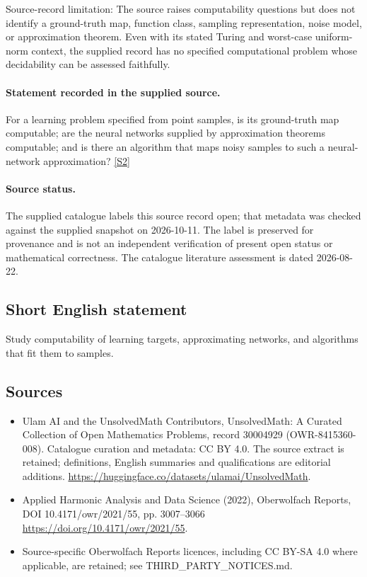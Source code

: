 \documentclass[11pt]{article}
\begin{document}
Source-record limitation: The source raises computability questions but does not identify a ground-truth map, function class, sampling representation, noise model, or approximation theorem. Even with its stated Turing and worst-case uniform-norm context, the supplied record has no specified computational problem whose decidability can be assessed faithfully.
\paragraph{Statement recorded in the supplied source.}
For a learning problem specified from point samples, is its ground-truth map computable; are the neural networks supplied by approximation theorems computable; and is there an algorithm that maps noisy samples to such a neural-network approximation? \href{https://doi.org/10.4171/owr/2021/55}{[S2]}
\paragraph{Source status.}
The supplied catalogue labels this source record open; that metadata was checked against the supplied snapshot on 2026-10-11. The label is preserved for provenance and is not an independent verification of present open status or mathematical correctness. The catalogue literature assessment is dated 2026-08-22.
\subsection{Short English statement}
Study computability of learning targets, approximating networks, and algorithms that fit them to samples.
\subsection{Sources}
\begin{itemize}
\item[S1] Ulam AI and the UnsolvedMath Contributors, UnsolvedMath: A Curated Collection of Open Mathematics Problems, record 30004929 (OWR-8415360-008). Catalogue curation and metadata: CC BY 4.0. The source extract is retained; definitions, English summaries and qualifications are editorial additions.
\url{https://huggingface.co/datasets/ulamai/UnsolvedMath}.
\item[S2] Applied Harmonic Analysis and Data Science (2022), Oberwolfach Reports, DOI 10.4171/owr/2021/55, pp. 3007--3066
\url{https://doi.org/10.4171/owr/2021/55}.
\item Source-specific Oberwolfach Reports licences, including CC BY-SA 4.0 where applicable, are retained; see THIRD\_PARTY\_NOTICES.md.
\end{itemize}
\end{document}
